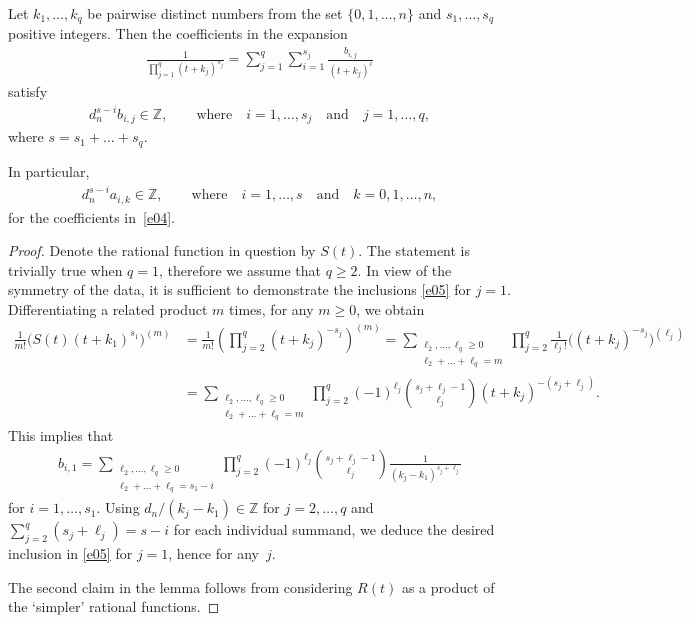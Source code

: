 \begin{lemma}\label{l1}
Let $k_1,\dots,k_q$ be pairwise distinct numbers from the set $\{0,1,\dots,n\}$ and $s_1,\dots,s_q$ positive integers. Then the coefficients in the expansion
\begin{gather*}
\frac1{\prod_{j=1}^q(t+k_j)^{s_j}} =\sum_{j=1}^q\sum_{i=1}^{s_j}\frac{b_{i,j}}{(t+k_j)^i}
\end{gather*}
satisfy
\begin{gather} d_n^{s-i}b_{i,j}\in\mathbb Z, \qquad\text{where}\quad i=1,\dots,s_j \quad \text{and}\quad j=1,\dots,q, \label{e05}
\end{gather}
where $s=s_1+\dots+s_q$.

In particular,
\begin{gather}
d_n^{s-i}a_{i,k}\in\mathbb Z, \qquad\text{where}\quad i=1,\dots,s \quad \text{and}\quad k=0,1,\dots,n, \label{e06}
\end{gather}
for the coefficients in~\eqref{e04}.
\end{lemma}

\begin{proof} Denote the rational function in question by $S(t)$. The statement is trivially true when $q=1$, therefore we assume that $q\ge2$. In view of the symmetry of the data, it is sufficient to demonstrate the inclusions \eqref{e05} for $j=1$. Differentiating a related product $m$ times, for any $m\ge0$, we obtain
\begin{align*}
\frac1{m!}\bigl(S(t)(t+k_1)^{s_1}\bigr)^{(m)}
&=\frac1{m!}\left(\prod_{j=2}^q(t+k_j)^{-s_j}\right)^{(m)}
=\sum_{\substack{\ell_2,\dots,\ell_q\ge0\\ \ell_2+\dots+\ell_q=m}}\prod_{j=2}^q\frac1{\ell_j!}\bigl((t+k_j)^{-s_j}\bigr)^{(\ell_j)}\\
&=\sum_{\substack{\ell_2,\dots,\ell_q\ge0\\ \ell_2+\dots+\ell_q=m}}\prod_{j=2}^q(-1)^{\ell_j}\binom{s_j+\ell_j-1}{\ell_j}(t+k_j)^{-(s_j+\ell_j)}.
\end{align*}
This implies that
\begin{gather*}
b_{i,1}=\sum_{\substack{\ell_2,\dots,\ell_q\ge0\\ \ell_2+\dots+\ell_q=s_1-i}}
\prod_{j=2}^q(-1)^{\ell_j}\binom{s_j+\ell_j-1}{\ell_j}\frac1{(k_j-k_1)^{s_j+\ell_j}}
\end{gather*}
for $i=1,\dots,s_1$. Using $d_n/(k_j-k_1)\in\mathbb Z$ for $j=2,\dots,q$ and $\sum_{j=2}^q(s_j+\ell_j)=s-i$ for each individual summand, we deduce the desired inclusion in \eqref{e05} for $j=1$, hence for any~$j$.

The second claim in the lemma follows from considering $R(t)$ as a product of the `simpler' rational functions.
\end{proof}

